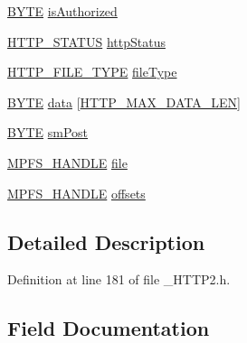 \begin{DoxyCompactItemize}
\item 
\hyperlink{_generic_type_defs_8h_a4ae1dab0fb4b072a66584546209e7d58}{B\+Y\+T\+E} \hyperlink{struct_h_t_t_p___c_o_n_n_ab1484bc12af6e3826e2126f838e9f959}{is\+Authorized}
\item 
\hyperlink{___h_t_t_p2_8h_a206fd44f1042cca9b94627107309cd5a}{H\+T\+T\+P\+\_\+\+S\+T\+A\+T\+U\+S} \hyperlink{struct_h_t_t_p___c_o_n_n_a70754ac19361072c5682d263362d083f}{http\+Status}
\item 
\hyperlink{___h_t_t_p2_8h_a7593488ef1dca167fe2bcf5912a12d9f}{H\+T\+T\+P\+\_\+\+F\+I\+L\+E\+\_\+\+T\+Y\+P\+E} \hyperlink{struct_h_t_t_p___c_o_n_n_a6032e015f49695df64987d24c9d7c7c2}{file\+Type}
\item 
\hyperlink{_generic_type_defs_8h_a4ae1dab0fb4b072a66584546209e7d58}{B\+Y\+T\+E} \hyperlink{struct_h_t_t_p___c_o_n_n_aa8e32b014e1b7e123bb31a518ae46a30}{data} \mbox{[}\hyperlink{_t_c_p_i_p_01_m_r_f24_w_8h_aad0b6afafdd44aca50e17cf912e6468e}{H\+T\+T\+P\+\_\+\+M\+A\+X\+\_\+\+D\+A\+T\+A\+\_\+\+L\+E\+N}\mbox{]}
\item 
\hyperlink{_generic_type_defs_8h_a4ae1dab0fb4b072a66584546209e7d58}{B\+Y\+T\+E} \hyperlink{struct_h_t_t_p___c_o_n_n_a819113468a27c4dd9ad6d0da54af08bd}{sm\+Post}
\item 
\hyperlink{_m_p_f_s2_8h_a2abe5ffe78d8d1eddc86d791e5ebd11a}{M\+P\+F\+S\+\_\+\+H\+A\+N\+D\+L\+E} \hyperlink{struct_h_t_t_p___c_o_n_n_a21cd7ab6be7456b2a2e1be4d128863f1}{file}
\item 
\hyperlink{_m_p_f_s2_8h_a2abe5ffe78d8d1eddc86d791e5ebd11a}{M\+P\+F\+S\+\_\+\+H\+A\+N\+D\+L\+E} \hyperlink{struct_h_t_t_p___c_o_n_n_af74c11b85692464cb002b3b35517c5b1}{offsets}
\end{DoxyCompactItemize}


\subsection{Detailed Description}


Definition at line 181 of file \+\_\+\+H\+T\+T\+P2.\+h.



\subsection{Field Documentation}
\hypertarget{struct_h_t_t_p___c_o_n_n_aa02a3d23a030e9524e25decbb213db08}{}
